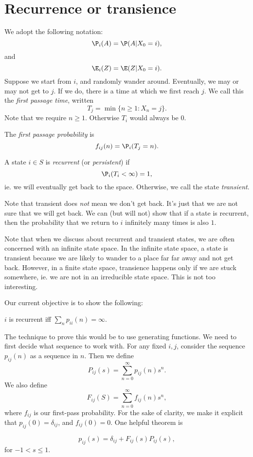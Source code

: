 \documentclass[a4paper]{article}
\begin{document}
\section{Recurrence or transience}
We adopt the following notation:
\[
  \P_i(A) = \P(A| X_0 = i),
\]
and
\[
  \E_i(Z) = \E(Z| X_0 = i).
\]
Suppose we start from $i$, and randomly wander around. Eventually, we may or may not get to $j$. If we do, there is a time at which we first reach $j$. We call this the \emph{first passage time}, written
\[
  T_j = \min\{n \geq 1: X_n = j\}.
\]
Note that we require $n \geq 1$. Otherwise $T_i$ would always be $0$.

The \emph{first passage probability} is
\[
  f_{ij}(n) = \P_i(T_j = n).
\]
\begin{defi}
  A state $i\in S$ is \emph{recurrent} (or \emph{persistent}) if
  \[
    \P_i (T_i < \infty) = 1,
  \]
  ie. we will eventually get back to the space. Otherwise, we call the state \emph{transient}.
\end{defi}
Note that transient does \emph{not} mean we don't get back. It's just that we are not sure that we will get back. We can (but will not) show that if a state is recurrent, then the probability that we return to $i$ infinitely many times is also $1$.

Note that when we discuss about recurrent and transient states, we are often concerned with an infinite state space. In the infinite state space, a state is transient because we are likely to wander to a place far far away and not get back. However, in a finite state space, transience happens only if we are stuck somewhere, ie. we are not in an irreducible state space. This is not too interesting.

Our current objective is to show the following:
\begin{thm}
  $i$ is recurrent iff $\sum_n p_{ii}(n) = \infty$.
\end{thm}
The technique to prove this would be to use generating functions. We need to first decide what sequence to work with. For any fixed $i, j$, consider the sequence $p_{ij}(n)$ as a sequence in $n$. Then we define
\[
  P_{ij}(s) = \sum_{n = 0}^\infty p_{ij}(n) s^n.
\]
We also define
\[
  F_{ij}(S) = \sum_{n = 0}^\infty f_{ij}(n) s^n,
\]
where $f_{ij}$ is our first-pass probability. For the sake of clarity, we make it explicit that $p_{ij}(0) = \delta_{ij}$, and $f_{ij}(0) = 0$. One helpful theorem is
\begin{thm}[]
  \[
    p_{ij}(s) = \delta_{ij} + F_{ij}(s)P_{ij}(s),
  \]
  for $-1 < s \leq 1$.
\end{thm}
\end{document}
